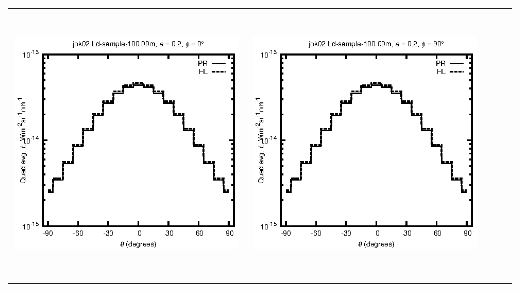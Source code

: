 \begin{tabular}{c c c c}
\includegraphics[height=7cm]{../eps/jok02_Ld_sample_100.00m_fwd.eps} &
\includegraphics[height=7cm]{../eps/jok02_Ld_sample_100.00m_cross.eps} \\
\end{tabular}

\pagebreak

